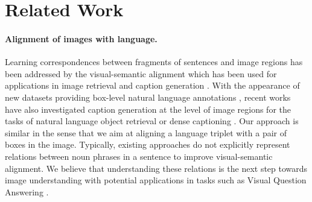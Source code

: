 \documentclass[10pt,twocolumn,letterpaper]{article}
\newcommand{\spaceparagraph}{\vspace{-.35cm}}
\begin{document}
\section{Related Work}

\paragraph{Alignment of images with language.}
Learning correspondences between fragments of sentences and image regions has been addressed by the visual-semantic alignment which has been used for applications in image retrieval and caption generation \cite{chang2015text,Karpathy2014,Karpathy2014a}. With the appearance of new datasets providing box-level natural language annotations \cite{Kazemzadeh2014,Krishna2016,Mao2016,Plummer2015}, recent works have also investigated caption generation at the level of image regions for the tasks of natural language object retrieval \cite{Hu2015,Mao2016,Rohrbach2015} or dense captioning \cite{Johnson2015}. Our approach is similar in the sense that we aim at aligning a language triplet with a pair of boxes in the image. Typically, existing approaches do not explicitly represent relations between noun phrases in a sentence to improve visual-semantic alignment. We believe that understanding these relations is the next step towards image understanding with potential applications in tasks such as Visual Question Answering \cite{Andreas2016}.

\spaceparagraph
\end{document}
